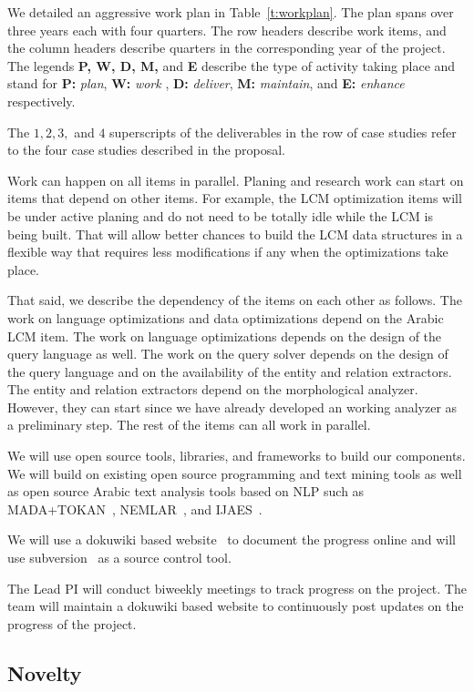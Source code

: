 \documentclass[12pt]{article}
\begin{document}
We detailed an aggressive work plan in Table~\ref{t:workplan}. 
The plan spans over three years each with four quarters. 
The row headers describe work items, and the column headers
describe quarters in the corresponding year of the project.
The legends {\bf P, W, D, M, } 
and {\bf E} 
describe the type of activity taking place 
and stand for 
{\bf P:} {\em plan}, 
{\bf W:} {\em work }, 
{\bf D:} {\em deliver}, 
{\bf M:}  {\em maintain}, 
and 
{\bf E: } {\em enhance} respectively. 

The $1,2,3,$ and $4$
superscripts of the deliverables in the 
row of case studies refer to the four 
case studies described in the proposal. 

Work can happen on all items in parallel. 
Planing and research work can start on items that depend
on other items. 
For example, the LCM optimization items will be under 
active planing and do not need to be totally idle 
while the LCM is being built. 
That will allow better chances to build the LCM data structures
in a flexible way that requires less modifications if any
when the optimizations take place. 

That said, we describe the dependency of the items on 
each other as follows. 
The work on language optimizations and data optimizations 
depend on the Arabic LCM item. 
The work on language optimizations depends on the design
of the query language as well. 
The work on the query solver depends on the design of the 
query language and on the availability of the entity and relation
extractors. 
The entity and relation extractors depend on the morphological 
analyzer. 
However, they can start since we have already
developed an working analyzer as a preliminary step. 
The rest of the items can all work in parallel. 

We will use open source tools, libraries, and frameworks to 
build our components.
We will build on existing open source programming and text 
mining tools as well as open source Arabic text analysis tools 
based on NLP such as MADA+TOKAN~\cite{Rot08}, 
NEMLAR~\cite{RAl09}, and IJAES~\cite{Int09}.

We will use a dokuwiki based website~\cite{Dok09} 
to document the progress online and will use 
subversion~\cite{Sub09} as a source control tool.
 
The Lead PI will conduct biweekly meetings to track progress 
on the project.
The team will maintain a dokuwiki based website to continuously 
post updates on the progress of the project.

\subsection{Novelty}
\end{document}
